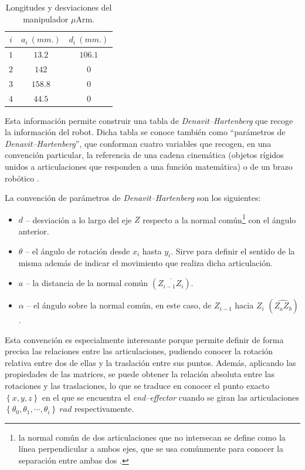 \begin{table}[ht]
\begin{minipage}{.49\linewidth}
\begin{tabular}{|| c | c c ||}
            $i$ & $a_i~(mm.)$ & $d_i~(mm.)$ \\ [0.5ex]
            \hline\hline
            $1$ & $13.2$      & $106.1$     \\
            \hline
            $2$ & $142$       & $0$         \\
            \hline
            $3$ & $158.8$     & $0$         \\
            \hline
            $4$ & $44.5$      & $0$         \\ [1ex]
            \hline
        \end{tabular}
        \caption{Longitudes y desviaciones del manipulador $\mu$Arm.}
    \end{minipage}
\end{table}

Esta información permite construir una tabla de \textit{Denavit--Hartenberg} que
recoge la información del robot. Dicha tabla se conoce también como ``parámetros de
\textit{Denavit--Hartenberg}'', que conforman cuatro variables que recogen, en una
convención particular, la referencia de una cadena cinemática (objetos rígidos unidos
a articulaciones que responden a una función matemática) o de un brazo robótico \cite{DenavitHartenbergParameters2020}.

La convención de parámetros de \textit{Denavit--Hartenberg} son los siguientes:
\begin{itemize}
    \item $d$ -- desviación a lo largo del eje $Z$ respecto a la normal común\footnote{la normal
              común de dos articulaciones que no intersecan se define como la línea perpendicular a
              ambos ejes, que se usa comúnmente para conocer la separación entre ambas dos \cite{CommonNormalRobotics2017}.}
          con el ángulo anterior.
    \item $\theta$ -- el ángulo de rotación desde $x_i$ hasta $y_i$. Sirve para definir
          el sentido de la misma además de indicar el movimiento que realiza dicha articulación.
    \item $a$ -- la distancia de la normal común $\left(\overline{Z_{i - 1}Z_i}\right)$.
    \item $\alpha$ -- el ángulo sobre la normal común, en este caso, de $Z_{i - 1}$ hacia $Z_i$ $\left(\widehat{Z_aZ_b}\right)$.
\end{itemize}

Esta convención es especialmente interesante porque permite definir de forma precisa
las relaciones entre las articulaciones, pudiendo conocer la rotación relativa entre
dos de ellas y la traslación entre sus puntos. Además, aplicando las propiedades
de las matrices, se puede obtener la relación absoluta entre las rotaciones y las
traslaciones, lo que se traduce en conocer el punto exacto $\left\{x, y, z\right\}$ en el que se encuentra el
\textit{end--effector} cuando se giran las articulaciones
$\left\{\theta_0, \theta_1, \cdots, \theta_i\right\}~rad$ respectivamente.

